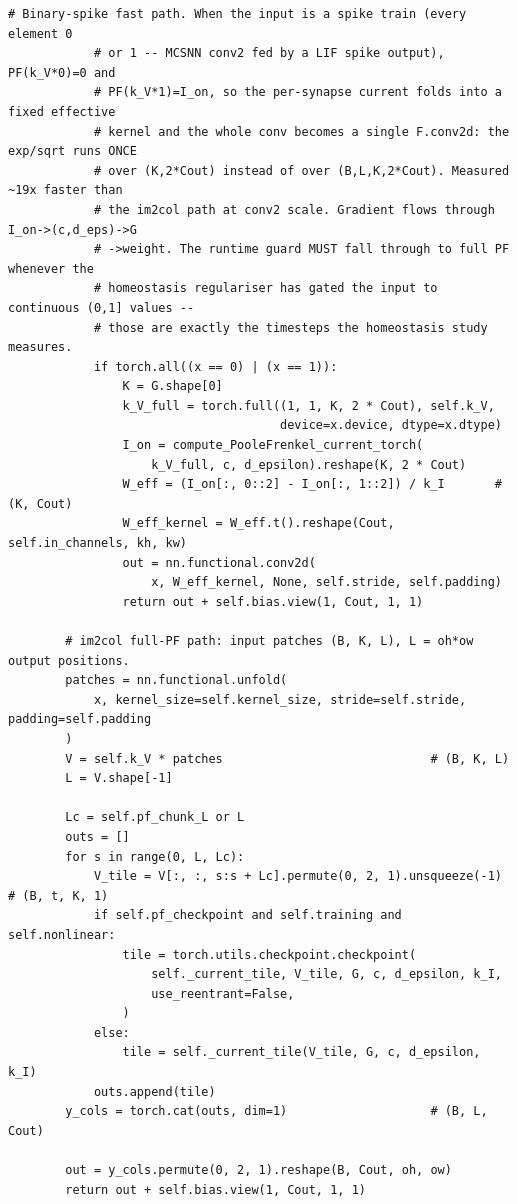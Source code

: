 \begin{lstlisting}[caption={mnn\_torch/layers.py},label={lst:mnn-src-layers}]
            # Binary-spike fast path. When the input is a spike train (every element 0
            # or 1 -- MCSNN conv2 fed by a LIF spike output), PF(k_V*0)=0 and
            # PF(k_V*1)=I_on, so the per-synapse current folds into a fixed effective
            # kernel and the whole conv becomes a single F.conv2d: the exp/sqrt runs ONCE
            # over (K,2*Cout) instead of over (B,L,K,2*Cout). Measured ~19x faster than
            # the im2col path at conv2 scale. Gradient flows through I_on->(c,d_eps)->G
            # ->weight. The runtime guard MUST fall through to full PF whenever the
            # homeostasis regulariser has gated the input to continuous (0,1] values --
            # those are exactly the timesteps the homeostasis study measures.
            if torch.all((x == 0) | (x == 1)):
                K = G.shape[0]
                k_V_full = torch.full((1, 1, K, 2 * Cout), self.k_V,
                                      device=x.device, dtype=x.dtype)
                I_on = compute_PooleFrenkel_current_torch(
                    k_V_full, c, d_epsilon).reshape(K, 2 * Cout)
                W_eff = (I_on[:, 0::2] - I_on[:, 1::2]) / k_I       # (K, Cout)
                W_eff_kernel = W_eff.t().reshape(Cout, self.in_channels, kh, kw)
                out = nn.functional.conv2d(
                    x, W_eff_kernel, None, self.stride, self.padding)
                return out + self.bias.view(1, Cout, 1, 1)

        # im2col full-PF path: input patches (B, K, L), L = oh*ow output positions.
        patches = nn.functional.unfold(
            x, kernel_size=self.kernel_size, stride=self.stride, padding=self.padding
        )
        V = self.k_V * patches                             # (B, K, L)
        L = V.shape[-1]

        Lc = self.pf_chunk_L or L
        outs = []
        for s in range(0, L, Lc):
            V_tile = V[:, :, s:s + Lc].permute(0, 2, 1).unsqueeze(-1)  # (B, t, K, 1)
            if self.pf_checkpoint and self.training and self.nonlinear:
                tile = torch.utils.checkpoint.checkpoint(
                    self._current_tile, V_tile, G, c, d_epsilon, k_I,
                    use_reentrant=False,
                )
            else:
                tile = self._current_tile(V_tile, G, c, d_epsilon, k_I)
            outs.append(tile)
        y_cols = torch.cat(outs, dim=1)                    # (B, L, Cout)

        out = y_cols.permute(0, 2, 1).reshape(B, Cout, oh, ow)
        return out + self.bias.view(1, Cout, 1, 1)



\end{lstlisting}
